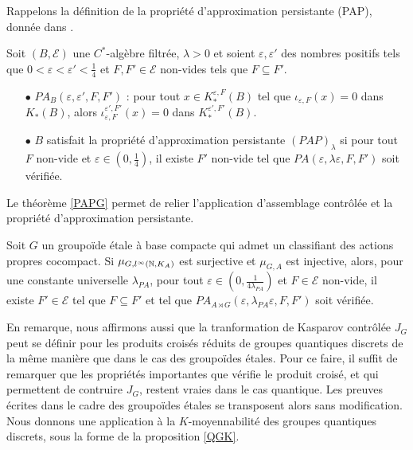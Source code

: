 Rappelons la définition de la propriété d'approximation persistante (PAP), donnée dans \cite{OY3}.

\begin{definition}
Soit $(B,\mathcal E)$ une $C^*$-algèbre filtrée, $\lambda>0$ et soient $\varepsilon,\varepsilon'$ des nombres positifs tels que $0<\varepsilon <\varepsilon' <\frac{1}{4}$ et $F,F'\in\mathcal E$ non-vides tels que $F\subseteq F'$. 
\begin{itemize}
\item[$\bullet$] $PA_B(\varepsilon,\varepsilon',F,F')$ : pour tout $x\in K_*^{\varepsilon,F}(B)$ tel que $\iota_{\varepsilon,F}(x)=0$ dans $K_*(B)$, alors $\iota_{\varepsilon,F}^{\varepsilon',F'}(x)=0$ dans $K_*^{\varepsilon',F'}(B)$.
\item[$\bullet$] $B$ satisfait la propriété d'approximation persistante $(PAP)_\lambda$ si pour tout $F$ non-vide et $\varepsilon\in (0,\frac{1}{4})$, il existe $F'$ non-vide tel que $PA(\varepsilon,\lambda\varepsilon,F,F')$ soit vérifiée.
\end{itemize}
\end{definition}

Le théorème \ref{PAPG} permet de relier l'application d'assemblage contrôlée et la propriété d'approximation persistante. 

\begin{thm} 
Soit $G$ un groupoïde étale à base compacte qui admet un classifiant des actions propres cocompact. Si $\mu_{G,l^\infty(\mathbb N, K_A)}$ est surjective et $\mu_{G,A}$ est injective, alors, pour une constante universelle $\lambda_{PA}$, pour tout $\varepsilon \in(0,\frac{1}{4\lambda_{PA}})$ et $F\in\mathcal E$ non-vide, il existe $F'\in\mathcal E$ tel que $F\subseteq F'$ et tel que $PA_{A\rtimes G}(\varepsilon,\lambda_{PA}\varepsilon,F,F')$ soit vérifiée.
\end{thm}

En remarque, nous affirmons aussi que la tranformation de Kasparov contrôlée $J_G$ peut se définir pour les produits croisés réduits de groupes quantiques discrets de la même manière que dans le cas des groupoïdes étales. Pour ce faire, il suffit de remarquer que les propriétés importantes que vérifie le produit croisé, et qui permettent de contruire $J_G$, restent vraies dans le cas quantique. Les preuves écrites dans le cadre des groupoïdes étales se transposent alors sans modification.\\

Nous donnons une application à la $K$-moyennabilité des groupes quantiques discrets, sous la forme de la proposition \ref{QGK}.

